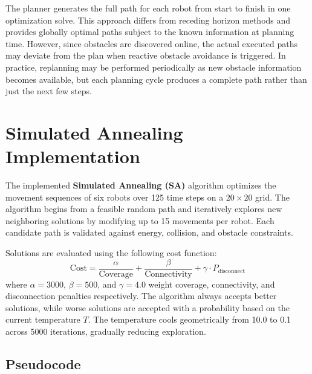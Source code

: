 The planner generates the full path for each robot from start to finish in one optimization solve. This approach differs from receding horizon methods and provides globally optimal paths subject to the known information at planning time. However, since obstacles are discovered online, the actual executed paths may deviate from the plan when reactive obstacle avoidance is triggered. In practice, replanning may be performed periodically as new obstacle information becomes available, but each planning cycle produces a complete path rather than just the next few steps.

\section{Simulated Annealing Implementation}

The implemented \textbf{Simulated Annealing (SA)} algorithm optimizes the movement sequences of six robots over 125 time steps on a $20 \times 20$ grid. The algorithm begins from a feasible random path and iteratively explores new neighboring solutions by modifying up to 15 movements per robot. Each candidate path is validated against energy, collision, and obstacle constraints.

Solutions are evaluated using the following cost function:
\[
\text{Cost} = \frac{\alpha}{\text{Coverage}} + \frac{\beta}{\text{Connectivity}} + \gamma \cdot P_{\text{disconnect}}
\]
where $\alpha=3000$, $\beta=500$, and $\gamma=4.0$ weight coverage, connectivity, and disconnection penalties respectively.  
The algorithm always accepts better solutions, while worse solutions are accepted with a probability based on the current temperature $T$. The temperature cools geometrically from 10.0 to 0.1 across 5000 iterations, gradually reducing exploration.

\subsection{Pseudocode}

